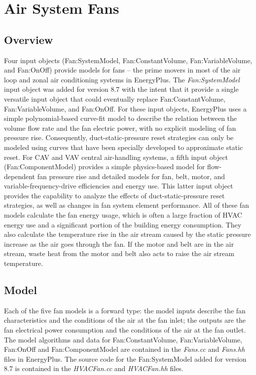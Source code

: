 \section{Air System Fans }\label{air-system-fans}

\subsection{Overview}\label{overview-002}

Four input objects (Fan:SystemModel, Fan:ConstantVolume, Fan:VariableVolume,
and Fan:OnOff) provide models for fans -- the prime movers in most of the air
loop and zonal air conditioning systems in EnergyPlus. The
\emph{Fan:SystemModel} input object was added for version 8.7 with the intent
that it provide a single versatile input object that could eventually replace
Fan:ConstantVolume, Fan:VariableVolume, and Fan:OnOff. For these input objects,
EnergyPlus uses a simple polynomial-based curve-fit model to describe the
relation between the volume flow rate and the fan electric power, with no
explicit modeling of fan pressure rise. Consequently, duct-static-pressure
reset strategies can only be modeled using curves that have been specially
developed to approximate static reset.  For CAV and VAV central air-handling
systems, a fifth input object (Fan:ComponentModel) provides a simple
physics-based model for flow-dependent fan pressure rise and detailed models
for fan, belt, motor, and variable-frequency-drive efficiencies and energy use.
This latter input object provides the capability to analyze the effects of
duct-static-pressure reset strategies, as well as changes in fan system element
performance. All of these fan models calculate the fan energy usage, which is
often a large fraction of HVAC energy use and a significant portion of the
building energy consumption. They also calculate the temperature rise in the
air stream caused by the static pressure increase as the air goes through the
fan. If the motor and belt are in the air stream, waste heat from the motor and
belt also acts to raise the air stream temperature.

\subsection{Model}\label{model-000}

Each of the five fan models is a forward type: the model inputs describe the
fan characteristics and the conditions of the air at the fan inlet; the outputs
are the fan electrical power consumption and the conditions of the air at the
fan outlet. The model algorithms and data for Fan:ConstantVolume,
Fan:VariableVolume, Fan:OnOff and Fan:ComponentModel are contained in the
\emph{Fans.cc} and \emph{Fans.hh} files in EnergyPlus.  The source code for the
Fan:SystemModel added for version 8.7 is contained in the \emph{HVACFan.cc} and
\emph{HVACFan.hh} files.

